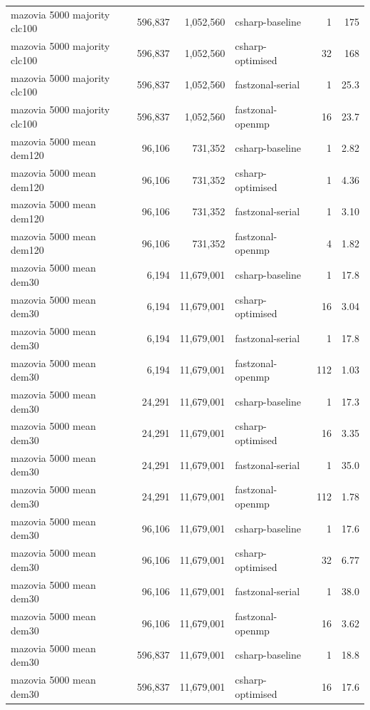 \begin{tabular}{lrrlrr}
mazovia 5000 majority clc100 & 596,837 & 1,052,560 & csharp-baseline & 1 & 175 \\
mazovia 5000 majority clc100 & 596,837 & 1,052,560 & csharp-optimised & 32 & 168 \\
mazovia 5000 majority clc100 & 596,837 & 1,052,560 & fastzonal-serial & 1 & 25.3 \\
mazovia 5000 majority clc100 & 596,837 & 1,052,560 & fastzonal-openmp & 16 & 23.7 \\
mazovia 5000 mean dem120 & 96,106 & 731,352 & csharp-baseline & 1 & 2.82 \\
mazovia 5000 mean dem120 & 96,106 & 731,352 & csharp-optimised & 1 & 4.36 \\
mazovia 5000 mean dem120 & 96,106 & 731,352 & fastzonal-serial & 1 & 3.10 \\
mazovia 5000 mean dem120 & 96,106 & 731,352 & fastzonal-openmp & 4 & 1.82 \\
mazovia 5000 mean dem30 & 6,194 & 11,679,001 & csharp-baseline & 1 & 17.8 \\
mazovia 5000 mean dem30 & 6,194 & 11,679,001 & csharp-optimised & 16 & 3.04 \\
mazovia 5000 mean dem30 & 6,194 & 11,679,001 & fastzonal-serial & 1 & 17.8 \\
mazovia 5000 mean dem30 & 6,194 & 11,679,001 & fastzonal-openmp & 112 & 1.03 \\
mazovia 5000 mean dem30 & 24,291 & 11,679,001 & csharp-baseline & 1 & 17.3 \\
mazovia 5000 mean dem30 & 24,291 & 11,679,001 & csharp-optimised & 16 & 3.35 \\
mazovia 5000 mean dem30 & 24,291 & 11,679,001 & fastzonal-serial & 1 & 35.0 \\
mazovia 5000 mean dem30 & 24,291 & 11,679,001 & fastzonal-openmp & 112 & 1.78 \\
mazovia 5000 mean dem30 & 96,106 & 11,679,001 & csharp-baseline & 1 & 17.6 \\
mazovia 5000 mean dem30 & 96,106 & 11,679,001 & csharp-optimised & 32 & 6.77 \\
mazovia 5000 mean dem30 & 96,106 & 11,679,001 & fastzonal-serial & 1 & 38.0 \\
mazovia 5000 mean dem30 & 96,106 & 11,679,001 & fastzonal-openmp & 16 & 3.62 \\
mazovia 5000 mean dem30 & 596,837 & 11,679,001 & csharp-baseline & 1 & 18.8 \\
mazovia 5000 mean dem30 & 596,837 & 11,679,001 & csharp-optimised & 16 & 17.6 \\

\end{tabular}
